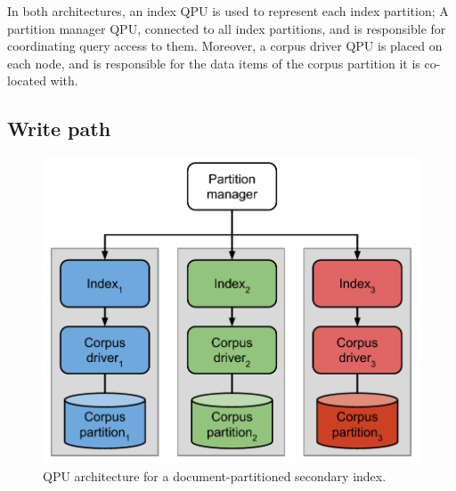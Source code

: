 In both architectures, an index QPU is used to represent each index partition;
A partition manager QPU, connected to all index partitions, and is responsible for coordinating query access to them.
Moreover, a corpus driver QPU is placed on each node, and is responsible for the data items of the corpus
partition it is co-located with.

\subsection{Write path}

\begin{figure}
  \begin{minipage}{.5\textwidth}
    \centering
    \includegraphics[scale=0.5]{./figures/case_studies/index_partitioned_by_document.pdf}
    \caption{QPU architecture for a document-partitioned secondary index.}
    \label{fig:index_partitioned_by_document}
  \end{minipage}%
  \begin{minipage}{.5\textwidth}
    \centering

\end{minipage}
\end{figure}
